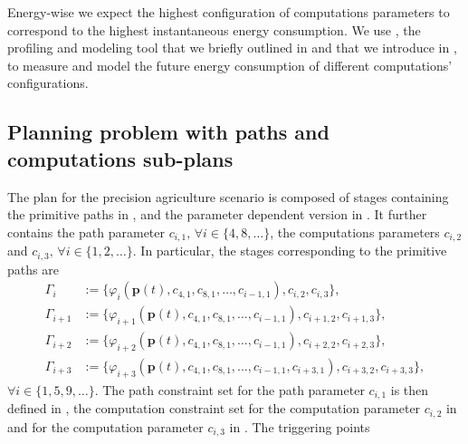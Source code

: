 Energy-wise we expect the highest configuration of computations parameters to correspond to the highest instantaneous energy consumption. We use \powprof{}, the profiling and modeling tool that we briefly outlined in  and that we introduce in , to measure and model the future energy consumption of different computations' configurations.

\subsection{Planning problem with paths and computations sub-plans}

The plan for the precision agriculture scenario is composed of stages containing the primitive paths in , and the parameter dependent version in . It further contains the path parameter $c_{i,1},\,\forall i\in\{4,8,\dots\}$, the computations parameters $c_{i,2}$ and $c_{i,3},\,\forall i\in\{1,2,\dots\}$. In particular, the stages corresponding to the primitive paths are 
\begin{subequations}\label{eq:ex-pb-stages}\begin{align}
  \Gamma_i&:=\{\varphi_i(\mathbf{p}(t),c_{4,1},c_{8,1},\dots,c_{i-1,1}),c_{i,2},c_{i,3}\},\label{eq:line-plan}\\
  \Gamma_{i+1}&:=\{\varphi_{i+1}(\mathbf{p}(t),c_{4,1},c_{8,1},\dots,c_{i-1,1}),c_{i+1,2},c_{i+1,3}\},\label{eq:circ-plan}\\
  \Gamma_{i+2}&:=\{\varphi_{i+2}(\mathbf{p}(t),c_{4,1},c_{8,1},\dots,c_{i-1,1}),c_{i+2,2},c_{i+2,3}\},\label{eq:line2-plan}\\
  \Gamma_{i+3}&:=\{\varphi_{i+3}(\mathbf{p}(t),c_{4,1},c_{8,1},\dots,c_{i-1,1},c_{i+3,1}),c_{i+3,2},c_{i+3,3}\},\label{eq:circ2-plan}
\end{align}
\end{subequations}
$\forall i\in\{1,5,9,\dots\}$. The path constraint set for the path parameter $c_{i,1}$ is then defined in , the computation constraint set for the computation parameter $c_{i,2}$ in  and for the computation parameter $c_{i,3}$ in . The triggering points
